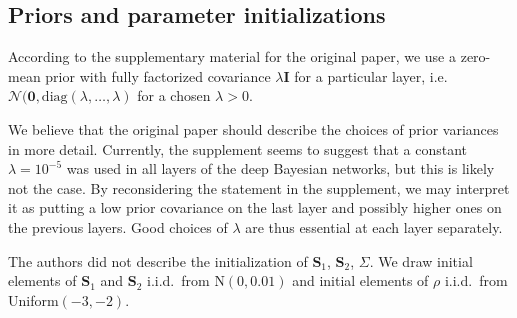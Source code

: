 \subsection{Priors and parameter initializations}\label{subsec:priors-and-parameter-initializations}
According to the supplementary material for the original paper, we use a zero-mean prior with fully factorized covariance $\lambda \mathbf{I}$ for a particular layer, i.e. $\mathcal{N}(\mathbf{0}, \mathrm{diag}(\lambda, \dots, \lambda)$ for a chosen $\lambda > 0$.

We believe that the original paper should describe the choices of prior variances in more detail.
Currently, the supplement seems to suggest that a constant $\lambda = 10^{-5}$ was used in all layers of the deep Bayesian networks, but this is likely not the case.
By reconsidering the statement in the supplement, we may interpret it as putting a low prior covariance on the last layer and possibly higher ones on the previous layers.
Good choices of $\lambda$ are thus essential at each layer separately.

The authors did not describe the initialization of $\mathbf{S}_1$, $\mathbf{S}_2$, $\Sigma$.
We draw initial elements of $\mathbf{S}_1$ and $\mathbf{S}_2$ i.i.d.\ from $\mathrm{N}(0, 0.01)$ and initial elements of $\rho$ i.i.d.\ from Uniform$(-3, -2)$.
